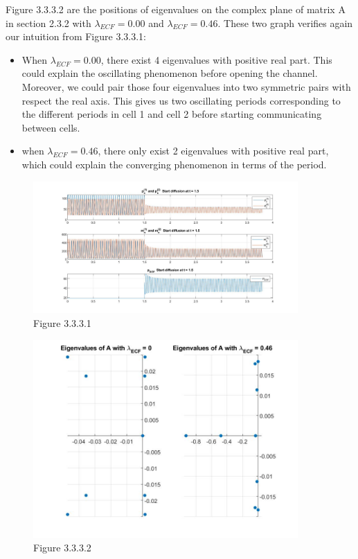 \documentclass[12pt]{article}
\renewcommand{\(}{\left (}
\renewcommand{\)}{\right )}
\begin{document}
Figure 3.3.3.2 are the positions of eigenvalues on the complex plane of matrix A in section 2.3.2 with $\lambda_{ECF} = 0.00$ and $\lambda_{ECF} = 0.46$. These two graph verifies again our intuition from Figure 3.3.3.1: \\
\begin{itemize}
    \item When $\lambda_{ECF} = 0.00$, there exist 4 eigenvalues with positive real part. This could explain the oscillating phenomenon before opening the channel. Moreover, we could pair those four eigenvalues into two symmetric pairs with respect the real axis. This gives us two oscillating periods corresponding to the different periods in cell 1 and cell 2 before starting communicating between cells.
    \item when $\lambda_{ECF} = 0.46$, there only exist 2 eigenvalues with positive real part, which could explain the converging phenomenon in terms of the period.
\end{itemize}

\newpage

\begin{figure}[h!]
    \centering
	\begin{minipage}{0.99\textwidth}
		\centering
		\includegraphics[width=0.9\textwidth]{UU.jpg}
		\caption*{\small Figure 3.3.3.1}
	\end{minipage}
\end{figure}

\begin{figure}[h!]
    \centering
	\begin{minipage}{0.99\textwidth}
		\centering
		\includegraphics[width=0.9\textwidth]{UUEi.jpg}
		\caption*{\small Figure 3.3.3.2}
	\end{minipage}
\end{figure}
\end{document}

